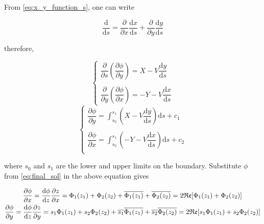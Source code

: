 \documentclass{article}
\begin{document}
From \cref{eq:x_y_function_s}, one can write

\begin{equation}
    \dfrac{\mathrm{d}}{\mathrm{d} s} = \dfrac{\partial }{\partial x} \dfrac{\mathrm{d} x}{\mathrm{d} s} + \dfrac{\partial }{\partial y} \dfrac{\mathrm{d} y}{\mathrm{d} s}
    \label{eq:ds}
\end{equation}

therefore,

\begin{equation*}
\left\{\begin{matrix}
    \dfrac{\partial}{\partial s}\left( \dfrac{\partial \phi}{\partial y} \right) = X - V \dfrac{\mathrm{d}y}{\mathrm{d}s}\\
    \\
    \dfrac{\partial}{\partial y}\left( \dfrac{\partial \phi}{\partial x} \right) = -Y - V \dfrac{\mathrm{d}x}{\mathrm{d}s}  
\end{matrix}\right.
\end{equation*}
\begin{equation*}
\left\{\begin{matrix}
    \dfrac{\partial \phi}{\partial y} = \displaystyle\int_{s_0}^{s_1}{\left (X - V \dfrac{\mathrm{d}y}{\mathrm{d}s}\right)} \mathrm{d}s + c_1\\
    \\
    \dfrac{\partial \phi}{\partial x} = \displaystyle\int_{s_0}^{s_1}{\left(-Y - V \dfrac{\mathrm{d}x}{\mathrm{d}s}\right)}\mathrm{d}s + c_2\\ 
\end{matrix}\right.
\end{equation*}

where $s_0$ and $s_1$ are the lower and upper limits on the boundary. Substitute $\phi$ from \cref{eq:final_sol} in the above equation gives

\begin{gather*}
    \dfrac{\partial \phi}{\partial x} = \dfrac{\mathrm{d}\phi}{\mathrm{d}z} \dfrac{\partial z}{\partial x} = \Phi_1(z_1) + \Phi_2(z_2) + \overline{\Phi_1(z_1)} + \overline{\Phi_2(z_2)}  \notag = 2 \mathfrak{Re}[\Phi_1(z_1) + \Phi_2(z_2)]\\
    \dfrac{\partial \phi}{\partial y} = \dfrac{\mathrm{d}\phi}{\mathrm{d}z} \dfrac{\partial z}{\partial y} = s_1 \Phi_1(z_1) + s_2 \Phi_2(z_2) + \overline{s_1} \overline{\Phi_1(z_1)} +\overline{s_2}\overline{\Phi_2(z_2)} = 2 \mathfrak{Re}[s_1 \Phi_1(z_1) + s_2 \Phi_2(z_2)]
\end{gather*}
\end{document}
